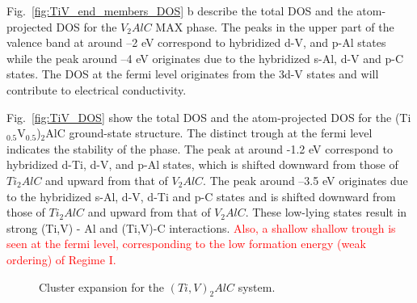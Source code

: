 \documentclass[preprint,amsmath,amssymb,aps, prb,showkeys]{revtex4-1}
\newcommand{\fig}[1]{Fig.~\ref{#1}}
\begin{document}
\fig{fig:TiV_end_members_DOS} b describe the total DOS and the atom-projected  DOS  for the $V_2AlC$ MAX phase. The peaks in the upper part of the valence band at around --2 eV correspond to hybridized d-V, and p-Al states while the peak around --4 eV originates due to the hybridized s-Al, d-V and p-C states. The DOS at the fermi level originates from the 3d-V states and will contribute to electrical conductivity.

\fig{fig:TiV_DOS} show the total DOS and the atom-projected  DOS  for the (Ti$_{0.5}$V$_{0.5}$)$_2$AlC ground-state structure. The distinct trough at the fermi level indicates the stability of the phase. The peak at around -1.2 eV correspond to hybridized d-Ti, d-V, and p-Al states, which is shifted downward from those of $Ti_2AlC$ and upward from that of $V_2AlC$. The peak around --3.5 eV originates due to the hybridized s-Al, d-V, d-Ti and p-C states and is shifted downward from those of $Ti_2AlC$ and upward from that of $V_2AlC$. These low-lying states result in strong (Ti,V) - Al and (Ti,V)-C interactions.  \textcolor{red}{Also, a shallow shallow trough is seen at the fermi level, corresponding to the low formation energy (weak ordering) of Regime I.}

 \begin{figure}[!htb]
	\centering
	\caption{Cluster expansion for the $(Ti,V)_2AlC$ system.}	
	\label{fig:TiV}
\end{figure}
\end{document}
